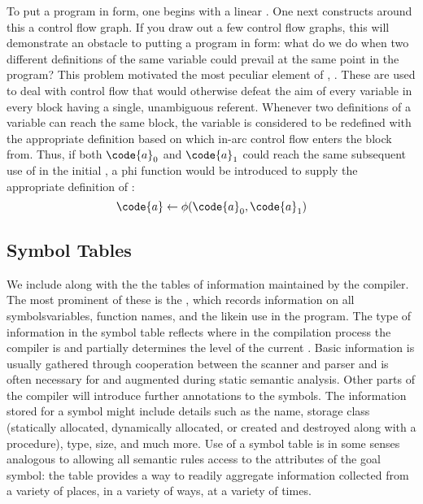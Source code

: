To put a program in \SSA form, one begins with a linear \IR. One next constructs around this a control flow graph. If you draw out a few control flow graphs, this will demonstrate an obstacle to putting a program in \SSA[long] form: what do we do when two different definitions of the same variable could prevail at the same point in the program? This problem motivated the most peculiar element of \SSA, . These are used to deal with control flow that would otherwise defeat the aim of every variable in every block having a single, unambiguous referent. Whenever two definitions of a variable can reach the same block, the variable is considered to be redefined with the appropriate definition based on which in-arc control flow enters the block from. Thus, if both $\code{a}_{0}$ and $\code{a}_{1}$ could reach the same subsequent use of  in the initial \IR, a phi function would be introduced to supply the appropriate definition of :
\[
\code{a} \gets \phi(\code{a}_{0}, \code{a}_{1})
\]
 

\subsection{Symbol Tables}
We include along with the \IR{} the tables of information maintained by the compiler. The most prominent of these is the , which records information on all symbols\empause variables, function names, and the like\empause in use in the program. The type of information in the symbol table reflects where in the compilation process the compiler is and partially determines the level of the current \IR. Basic information is usually gathered through cooperation between the scanner and parser and is often necessary for and augmented during static semantic analysis. Other parts of the compiler will introduce further annotations to the symbols. The information stored for a symbol might include details such as the name, storage class (statically allocated, dynamically allocated, or created and destroyed along with a procedure), type, size, and much more. Use of a symbol table is in some senses analogous to allowing all semantic rules access to the attributes of the goal symbol: the table provides a way to readily aggregate information collected from a variety of places, in a variety of ways, at a variety of times.